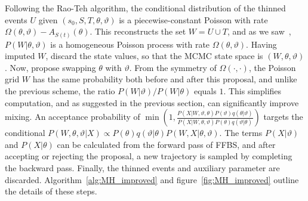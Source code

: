 Following the Rao-Teh algorithm, the conditional distribution of the thinned events $U$ given $(s_0,S,T,\theta,\vartheta)$ is a piecewise-constant Poisson with rate $\Omega(\theta, \vartheta) - A_{S(t)}(\theta)$. 
This reconstructs the set $W = U \cup T$,  and as we saw~\citep[see also][]{RaoTeh13}, $P(W|\theta,\vartheta)$ is a homogeneous Poisson process with rate $\Omega(\theta, \vartheta)$. 
Having imputed $W$, discard the state values, so that the MCMC state space is $(W, \theta, \vartheta)$.
Now, propose swapping $\theta$ with $\vartheta$. 
From the symmetry of $\Omega(\cdot,\cdot)$, the Poisson grid $W$ has the same probability both
before and after this proposal, and unlike the previous scheme, the ratio $P(W|\vartheta)/P(W|\theta)$ equals $1$.  
This simplifies computation, and as suggested in the previous section, can significantly improve mixing.
An acceptance probability of
$ 
  \min\left(1, \frac{P(X|W,\vartheta,\theta) P(\vartheta) q(\theta|\vartheta)}
   {P(X|W,\theta,\vartheta) P(\theta)q(\vartheta|\theta)}\right)
   $ 
   targets the conditional $P(W,\theta,\vartheta|X) \propto P(\theta)q(\vartheta|\theta)P(W,X|\theta,\vartheta)$.
   The terms $P(X|\vartheta)$ and  $P(X|\theta)$ can be calculated from the forward pass of FFBS, and after
   accepting or rejecting the proposal, a new trajectory is sampled by
   completing the backward pass. Finally, the thinned events and auxiliary parameter are
   discarded. Algorithm~\ref{alg:MH_improved} and 
   figure~\ref{fig:MH_improved} outline the details of these steps. 

